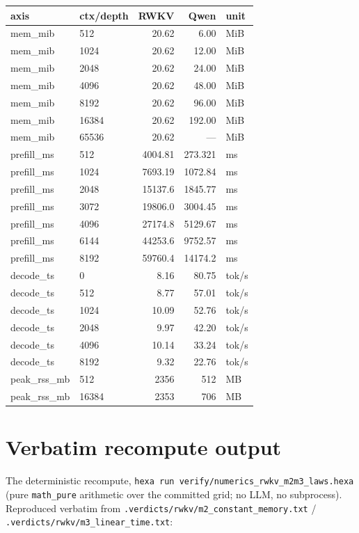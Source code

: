 \documentclass[11pt,a4paper]{article}
\begin{document}
\begin{center}
\small
\begin{tabular}{llrrl}
\toprule
axis & ctx/depth & RWKV & Qwen & unit \\
\midrule
mem\_mib    & 512   & 20.62   & 6.00    & MiB \\
mem\_mib    & 1024  & 20.62   & 12.00   & MiB \\
mem\_mib    & 2048  & 20.62   & 24.00   & MiB \\
mem\_mib    & 4096  & 20.62   & 48.00   & MiB \\
mem\_mib    & 8192  & 20.62   & 96.00   & MiB \\
mem\_mib    & 16384 & 20.62   & 192.00  & MiB \\
mem\_mib    & 65536 & 20.62   & ---     & MiB \\
prefill\_ms & 512   & 4004.81 & 273.321 & ms  \\
prefill\_ms & 1024  & 7693.19 & 1072.84 & ms  \\
prefill\_ms & 2048  & 15137.6 & 1845.77 & ms  \\
prefill\_ms & 3072  & 19806.0 & 3004.45 & ms  \\
prefill\_ms & 4096  & 27174.8 & 5129.67 & ms  \\
prefill\_ms & 6144  & 44253.6 & 9752.57 & ms  \\
prefill\_ms & 8192  & 59760.4 & 14174.2 & ms  \\
decode\_ts  & 0     & 8.16    & 80.75   & tok/s \\
decode\_ts  & 512   & 8.77    & 57.01   & tok/s \\
decode\_ts  & 1024  & 10.09   & 52.76   & tok/s \\
decode\_ts  & 2048  & 9.97    & 42.20   & tok/s \\
decode\_ts  & 4096  & 10.14   & 33.24   & tok/s \\
decode\_ts  & 8192  & 9.32    & 22.76   & tok/s \\
peak\_rss\_mb & 512  & 2356   & 512     & MB \\
peak\_rss\_mb & 16384& 2353   & 706     & MB \\
\bottomrule
\end{tabular}
\end{center}

\section{Verbatim recompute output}
\label{app:verify}
The deterministic recompute, \texttt{hexa run
verify/numerics\_rwkv\_m2m3\_laws.hexa} (pure \texttt{math\_pure} arithmetic over
the committed grid; no LLM, no subprocess). Reproduced verbatim from
\texttt{.verdicts/rwkv/m2\_constant\_memory.txt} /
\texttt{.verdicts/rwkv/m3\_linear\_time.txt}:
\end{document}
